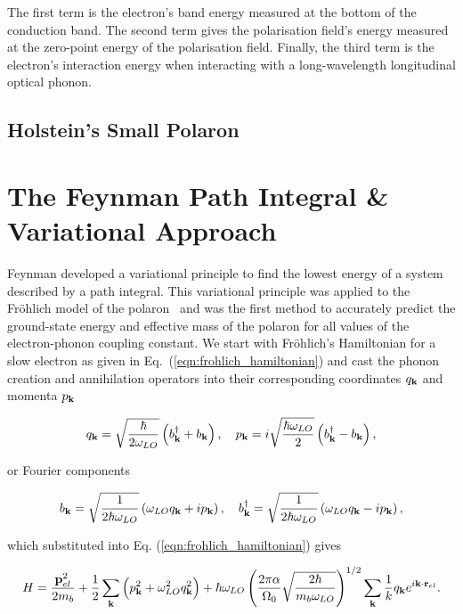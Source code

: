 The first term is the electron's band energy measured at the bottom of the conduction band. The second term gives the polarisation field's energy measured at the zero-point energy of the polarisation field. Finally, the third term is the electron's interaction energy when interacting with a long-wavelength longitudinal optical phonon.

\subsection{Holstein's Small Polaron}
\label{subsec:2-1-3}

\section{The Feynman Path Integral \& Variational Approach}
\label{sec:2-2}

Feynman developed a variational principle to find the lowest energy of a system described by a path integral. This variational principle was applied to the Fr\"ohlich model of the polaron~\cite{frohlich_electrons_1954} and was the first method to accurately predict the ground-state energy and effective mass of the polaron for all values of the electron-phonon coupling constant. We start with Fr\"ohlich's Hamiltonian for a slow electron as given in Eq.~(\ref{eqn:frohlich_hamiltonian}) and cast the phonon creation and annihilation operators into their corresponding coordinates $q_{\vb{k}}$ and momenta $p_{\vb{k}}$

\begin{equation}
   q_{\vb{k}} = \sqrt{\frac{\hbar}{2\omega_{LO}}} \left(b^\dagger_{\vb{k}} + b_{\vb{k}} \right), \quad p_{\vb{k}} = i\sqrt{\frac{\hbar \omega_{LO}}{2}} \left(b^\dagger_{\vb{k}} - b_{\vb{k}} \right),
\end{equation}

or Fourier components

\begin{equation}
   b_{\vb{k}} = \sqrt{\frac{1}{2\hbar\omega_{LO}}} \left(\omega_{LO} q_{\vb{k}} + i p_{\vb{k}} \right), \quad b^\dagger_{\vb{k}} = \sqrt{\frac{1}{2\hbar\omega_{LO}}} \left(\omega_{LO} q_{\vb{k}} - i p_{\vb{k}} \right),
\end{equation}

which substituted into Eq. (\ref{eqn:frohlich_hamiltonian}) gives

\begin{equation}
    H = \frac{\vb{p}_{el}^2}{2m_b} + \frac{1}{2} \sum_{\vb{k}} \left( p_{\vb{k}}^2 + \omega_{LO}^2 q_{\vb{k}}^2 \right) + \hbar \omega_{LO} \left(\frac{2 \pi \alpha}{\Omega_0} \sqrt{\frac{2 \hbar}{m_b \omega_{LO}}}\right)^{1/2} \sum_{\vb{k}} \frac{1}{k} q_{\vb{k}} e^{i \vb{k} \cdot \vb{r}_{el}}.
\end{equation}

